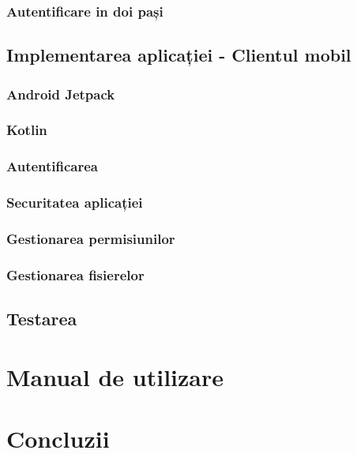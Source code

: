 \documentclass[a4paper]{article}
\begin{document}
\subsubsection{Autentificare in doi pași}

\subsection{Implementarea aplicației - Clientul mobil}
\subsubsection{Android Jetpack}
\subsubsection{Kotlin}
\subsubsection{Autentificarea}
\subsubsection{Securitatea aplicației}
\subsubsection{Gestionarea permisiunilor}
\subsubsection{Gestionarea fisierelor}

\subsection{Testarea}

\section{Manual de utilizare}

\section{Concluzii}




\newpage

\listoffigures
\end{document}
